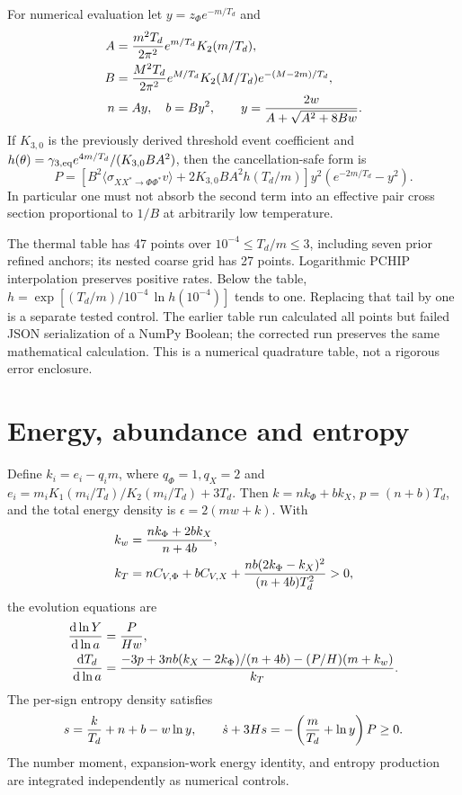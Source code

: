 \documentclass[11pt]{article}
\newcommand{\dd}{\mathrm d}
\begin{document}
For numerical evaluation let $y=z_\Phi e^{-m/T_d}$ and
\begin{align}
 A&={m^2T_d\over2\pi^2}e^{m/T_d}K_2(m/T_d),\\
 B&={M^2T_d\over2\pi^2}e^{M/T_d}K_2(M/T_d)
       e^{-(M-2m)/T_d},\\
 n&=Ay,\quad b=By^2,\qquad
 y={2w\over A+\sqrt{A^2+8Bw}}.
\end{align}
If $K_{3,0}$ is the previously derived threshold event coefficient and
$h(\theta)=\gamma_{3,\rm eq}e^{4m/T_d}/(K_{3,0}BA^2)$,
then the cancellation-safe form is
\begin{equation}
 P=\left[B^2\langle\sigma_{XX^*\to\Phi\Phi^*}v\rangle
             +2K_{3,0}BA^2h(T_d/m)\right]
             y^2(e^{-2m/T_d}-y^2).
 \label{ag:scaled}
\end{equation}
In particular one must not absorb the second term into an effective
pair cross section proportional to $1/B$ at arbitrarily low temperature.

The thermal table has 47 points over $10^{-4}\leq T_d/m\leq3$,
including seven prior refined anchors; its nested coarse grid has 27 points.
Logarithmic PCHIP interpolation preserves positive rates. Below the table,
$h=\exp[(T_d/m)/10^{-4}\,\ln h(10^{-4})]$ tends to one. Replacing
that tail by one is a separate tested control. The earlier table run
calculated all points but failed JSON serialization of a NumPy Boolean;
the corrected run preserves the same mathematical calculation. This is
a numerical quadrature table, not a rigorous error enclosure.

\section{Energy, abundance and entropy}
Define $k_i=e_i-q_i m$, where $q_\Phi=1,q_X=2$ and
$e_i=m_iK_1(m_i/T_d)/K_2(m_i/T_d)+3T_d$.
Then $k=nk_\Phi+bk_X$, $p=(n+b)T_d$, and the total energy density
is $\epsilon=2(mw+k)$. With
\begin{align}
 k_w&={nk_\Phi+2bk_X\over n+4b},\\
 k_T&=nC_{V,\Phi}+bC_{V,X}
       +{nb(2k_\Phi-k_X)^2\over(n+4b)T_d^2}>0,
\end{align}
the evolution equations are
\begin{align}
 {\dd\ln Y\over\dd\ln a}&={P\over Hw},\\
 {\dd T_d\over\dd\ln a}&={-3p+3nb(k_X-2k_\Phi)/(n+4b)
                      -(P/H)(m+k_w)\over k_T}.
\end{align}
The per-sign entropy density satisfies
\begin{equation}
 s={k\over T_d}+n+b-w\ln y,\qquad
 \dot s+3Hs=-\left({m\over T_d}+\ln y\right)P\geq0.
\end{equation}
The number moment, expansion-work energy identity, and entropy production
are integrated independently as numerical controls.
\end{document}
